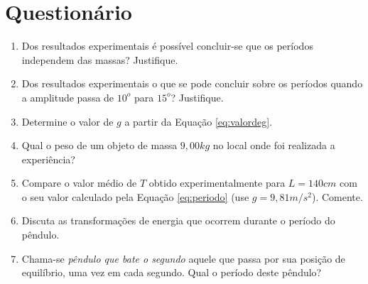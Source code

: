 \documentclass[10pt,a4paper,onecolumn,notitlepage]{scrartcl}
\begin{document}
\section{Questionário}
\begin{enumerate}
\item Dos resultados experimentais  é  possível  concluir-se  que  os  períodos  independem  das  massas?  Justifique.
\item Dos resultados experimentais o que se pode concluir sobre os períodos quando a amplitude passa de $10^o$ para $15^o$? Justifique.
\item Determine o valor de $g$ a partir da Equação \ref{eq:valordeg}.
\item Qual o peso de um objeto de massa $9,00kg$ no local onde foi realizada a experiência?
\item Compare  o  valor médio  de  $T$  obtido  experimentalmente  para  $L = 140 cm$  com  o  seu  valor  calculado  pela  Equação \ref{eq:periodo}  (use $g = 9,81 m/s^2$). Comente.
\item Discuta  as  transformações  de  energia  que  ocorrem  durante  o  período  do  pêndulo.
\item Chama-se  \emph{pêndulo  que  bate  o  segundo}  aquele  que  passa  por  sua  posição  de  equilíbrio,  uma  vez  em  cada  segundo.  Qual  o  período  deste  pêndulo?
\end{enumerate}
\end{document}
